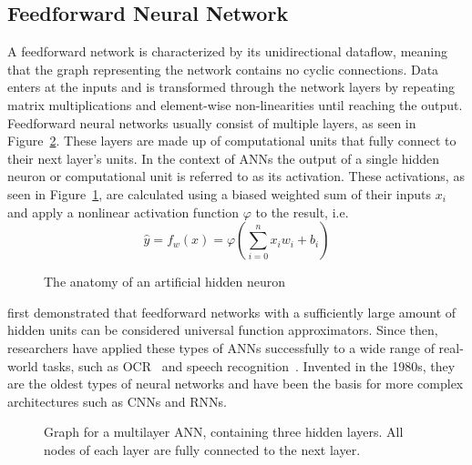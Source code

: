 \subsection{Feedforward Neural Network}
\label{sec:feedforward}
A feedforward network is characterized by its unidirectional dataflow, meaning that the graph representing the network contains no cyclic connections. Data enters at the inputs and is transformed through the network layers by repeating matrix multiplications and element-wise non-linearities until reaching the output. Feedforward neural networks usually consist of multiple layers, as seen in Figure~\ref{fig:feedforward}. These layers are made up of computational units that fully connect to their next layer's units. In the context of \acp{ANN} the output of a single hidden neuron or computational unit is referred to as its activation. These activations, as seen in Figure~\ref{fig:neuron}, are calculated using a biased weighted sum of their inputs $x_i$ and apply a nonlinear activation function $\varphi$ to the result, i.e.
\begin{equation}
\hat{y} = f_w(x) = \varphi\left(\sum\limits_{i=0}^{n} x_i w_i + b_i\right)
\label{eq:neuron}
\end{equation}
\begin{figure}[H]
	\centering
	\hfill
	\caption{The anatomy of an artificial hidden neuron}
	\label{fig:neuron}
\end{figure}
\cite{Hornik:1989} first demonstrated that feedforward networks with a sufficiently large amount of hidden units can be considered universal function approximators. Since then, researchers have applied these types of \acp{ANN} successfully to a wide range of real-world tasks, such as \ac{OCR}~\parencite{LeCun:1989} and speech recognition~\parencite{Morgan:1990}. Invented in the 1980s, they are the oldest types of neural networks and have been the basis for more complex architectures such as \acp{CNN} and \acp{RNN}.
\begin{figure}[H]
	\centering
	
	\caption{Graph for a multilayer \ac{ANN}, containing three hidden layers. All nodes of each layer are fully connected to the next layer.}
	\label{fig:feedforward}
\end{figure}
